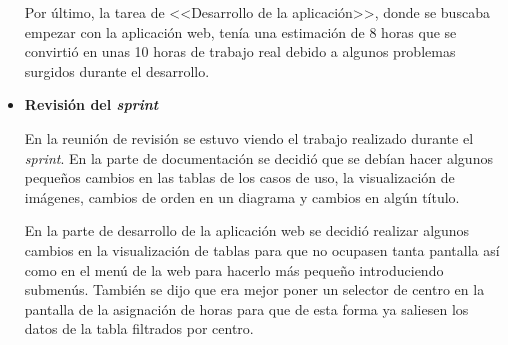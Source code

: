 \begin{itemize}
Por último, la tarea de <<Desarrollo de la aplicación>>, donde se buscaba empezar con la aplicación web, tenía una estimación de 8 horas que se convirtió en unas 10 horas de trabajo real debido a algunos problemas surgidos durante el desarrollo.

\item\textbf{Revisión del \textit{sprint}}

En la reunión de revisión se estuvo viendo el trabajo realizado durante el \textit{sprint}. En la parte de documentación se decidió que se debían hacer algunos pequeños cambios en las tablas de los casos de uso, la visualización de imágenes, cambios de orden en un diagrama y cambios en algún título.

En la parte de desarrollo de la aplicación web se decidió realizar algunos cambios en la visualización de tablas para que no ocupasen tanta pantalla así como en el menú de la web para hacerlo más pequeño introduciendo submenús. También se dijo que era mejor poner un selector de centro en la pantalla de la asignación de horas para que de esta forma ya saliesen los datos de la tabla filtrados por centro. 
\end{itemize}

